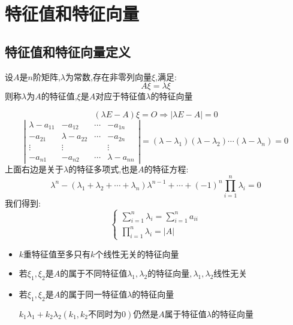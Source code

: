 \chapter{特征值和特征向量}
\section{特征值和特征向量定义}
\begin{definition}[特征值和特征向量]
	设$A$是$n$阶矩阵,$\lambda$为常数,存在非零列向量$\xi$,满足:  
	$$A\xi=\lambda\xi$$
	则称$\lambda$为$A$的特征值,$\xi$是$A$对应于特征值$\lambda$的特征向量
	\begin{anymark}[注]
		$$(\lambda E-A)\xi=O\Rightarrow |\lambda E-A|=0$$
		$$\left|
		\begin{matrix}
			\lambda-a_{11}&-a_{12}&\cdots&-a_{1n}\\
			-a_{21}&\lambda-a_{22}&\cdots&-a_{2n}\\
			\vdots&	\vdots& &	\vdots\\
			-a_{n1}&-a_{n2}&\cdots&\lambda-a_{nn}
		\end{matrix}
		\right|=(\lambda-\lambda_{1})(\lambda-\lambda_{2})\cdots(\lambda-\lambda_{n})=0$$
		上面右边是关于$\lambda$的特征多项式,也是$A$的特征方程:  
		$$\lambda^{n}-(\lambda_{1}+\lambda_{2}+\cdots+\lambda_{n})\lambda^{n-1}+\cdots+(-1)^{n}\prod\limits_{i=1}^{n}\lambda_{i}=0$$
		我们得到:  
		$$\left\lbrace 
		\begin{array}{l}
			\sum\limits_{i=1}^{n}\lambda_{i}=\sum\limits_{i=1}^{n}a_{ii}\\
			\prod\limits_{i=1}^{n}\lambda_{i}=|A|
		\end{array}
		\right. $$
	\end{anymark}
	\begin{corollary}[特征向量]
		\begin{itemize}
			\item $k\text{重特征值至多只有}k\text{个线性无关的特征向量}$
			\item $\text{若}\xi_{1},\xi_{2}\text{是}A\text{的属于不同特征值}\lambda_{1},\lambda_{2}\text{的特征向量},\lambda_{1},\lambda_{2}\text{线性无关}$
			\item $\text{若}\xi_{1},\xi_{2}\text{是}A\text{的属于同一特征值}\lambda\text{的特征向量}$
			
			$k_{1}\lambda_{1}+k_{2}\lambda_{2}(k_{1},k_{2}\text{不同时为}0)\text{仍然是}A\text{属于特征值}\lambda\text{的特征向量}$
		\end{itemize}
	\end{corollary}
\end{definition}
